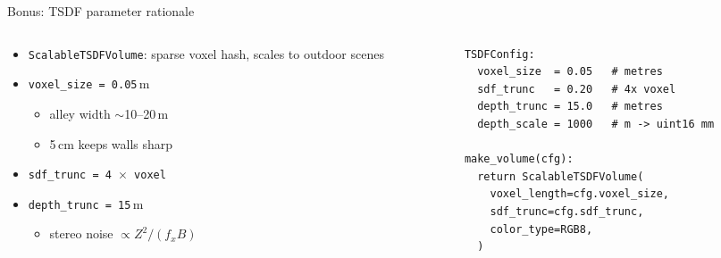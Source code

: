 \documentclass[aspectratio=169,11pt]{beamer}
\newcommand{\code}[1]{\texttt{#1}}
\begin{document}
\begin{frame}[fragile]{Bonus: TSDF parameter rationale}
\begin{columns}[T,totalwidth=\textwidth]
\begin{column}{0.44\textwidth}
\begin{itemize}
    \item \code{ScalableTSDFVolume}: sparse voxel hash, scales to outdoor scenes
    \item \code{voxel\_size = 0.05}\,m
    \begin{itemize}
        \item alley width $\sim$10--20\,m
        \item 5\,cm keeps walls sharp
    \end{itemize}
    \item \code{sdf\_trunc = 4 $\times$ voxel}
    \item \code{depth\_trunc = 15}\,m
    \begin{itemize}
        \item stereo noise $\propto Z^2 / (f_x B)$
    \end{itemize}
\end{itemize}
\end{column}
\begin{column}{0.52\textwidth}
\scriptsize
\begin{verbatim}
TSDFConfig:
  voxel_size  = 0.05   # metres
  sdf_trunc   = 0.20   # 4x voxel
  depth_trunc = 15.0   # metres
  depth_scale = 1000   # m -> uint16 mm

make_volume(cfg):
  return ScalableTSDFVolume(
    voxel_length=cfg.voxel_size,
    sdf_trunc=cfg.sdf_trunc,
    color_type=RGB8,
  )
\end{verbatim}
\end{column}
\end{columns}
\end{frame}
\end{document}
